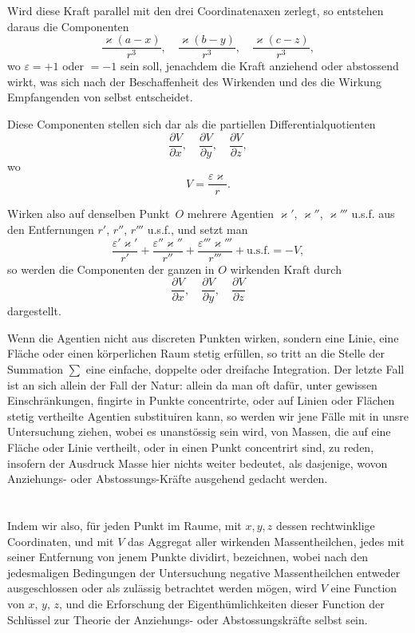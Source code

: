 \documentclass[12pt,a4paper]{article}
\begin{document}
Wird diese Kraft parallel mit den drei Coordinatenaxen zerlegt, so entstehen
daraus die Componenten
\[
\frac{\varkappa(a-x)}{r^3},\quad
\frac{\varkappa(b-y)}{r^3},\quad
\frac{\varkappa(c-z)}{r^3},
\]
wo $\varepsilon = +1$ oder $=-1$ sein soll, jenachdem die Kraft anziehend oder abstossend
wirkt, was sich nach der Beschaffenheit des Wirkenden und des die
Wirkung Empfangenden von selbst entscheidet.

Diese Componenten stellen sich dar als die partiellen Differentialquotienten
\[
\frac{\partial V}{\partial x},\quad \frac{\partial V}{\partial y},\quad \frac{\partial V}{\partial z},
\]
wo
\[
V = \frac{\varepsilon\varkappa}{r}.
\]

Wirken also auf denselben Punkt~$O$ mehrere Agentien $\varkappa'$, $\varkappa''$, $\varkappa'''$ u.s.f.
aus den Entfernungen $r'$, $r''$, $r'''$ u.s.f., und setzt man
\[
\frac{\varepsilon'\varkappa'}{r'}+\frac{\varepsilon''\varkappa''}{r''}+\frac{\varepsilon'''\varkappa'''}{r'''}+\text{u.s.f.}= -V,
\]
so werden die Componenten der ganzen in $O$ wirkenden Kraft durch
\[
\frac{\partial V}{\partial x},\quad \frac{\partial V}{\partial y},\quad \frac{\partial V}{\partial z}
\]
dargestellt.

Wenn die Agentien nicht aus discreten Punkten wirken, sondern eine Linie,
eine Fläche oder einen körperlichen Raum stetig erfüllen, so tritt an die
Stelle der Summation $\sum$ eine einfache, doppelte oder dreifache Integration.
Der letzte Fall ist an sich allein der Fall der Natur: allein da man oft dafür, unter
gewissen Einschränkungen, fingirte in Punkte concentrirte, oder auf Linien oder
Flächen stetig vertheilte Agentien substituiren kann, so werden wir jene Fälle
mit in unsre Untersuchung ziehen, wobei es unanstössig sein wird, von Massen,
die auf eine Fläche oder Linie vertheilt, oder in einen Punkt concentrirt sind,
zu reden, insofern der Ausdruck Masse hier nichts weiter bedeutet, als dasjenige,
wovon Anziehungs- oder Abstossungs-Kräfte ausgehend gedacht werden.

\section{}
Indem wir also, für jeden Punkt im Raume, mit $x,y,z$ dessen rechtwinklige
Coordinaten, und mit $V$ das Aggregat aller wirkenden Massentheilchen, jedes
mit seiner Entfernung von jenem Punkte dividirt, bezeichnen, wobei nach
den jedesmaligen Bedingungen der Untersuchung negative Massentheilchen entweder
ausgeschlossen oder als zulässig betrachtet werden mögen, wird $V$ eine
Function von $x$, $y$, $z$, und die Erforschung der Eigenthümlichkeiten dieser
Function der Schlüssel zur Theorie der Anziehungs- oder Abstossungskräfte selbst
sein.
\end{document}
